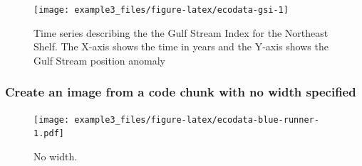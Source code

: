 \documentclass[
]{article}
\begin{document}
\begin{figure}
\texttt{[image: example3\_files/figure-latex/ecodata-gsi-1]} \caption{Time series describing the the Gulf Stream Index for the Northeast Shelf. The X-axis shows the time in years and the Y-axis shows the Gulf Stream position anomaly}\label{fig:ecodata-gsi}
\end{figure}

\subsubsection{Create an image from a code chunk with no width
specified}\label{create-an-image-from-a-code-chunk-with-no-width-specified}

\begin{figure}
\centering
\texttt{[image: example3\_files/figure-latex/ecodata-blue-runner-1.pdf]}
\caption{No width.}
\end{figure}
\end{document}
